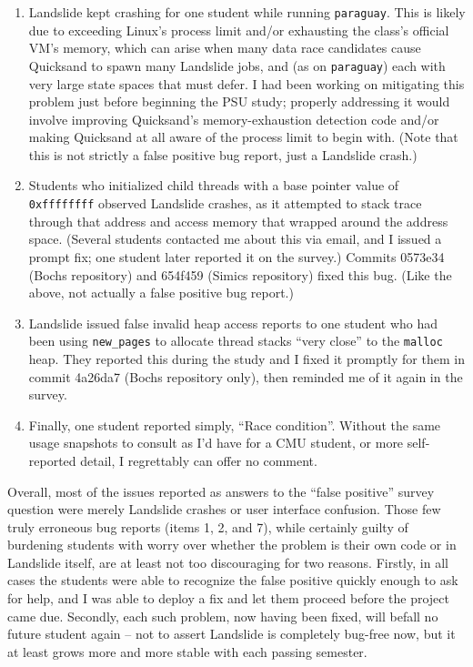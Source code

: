 \begin{enumerate}
	\item Landslide kept crashing for one student while running {\tt paraguay}.
		This is likely due to exceeding Linux's process limit and/or exhausting the class's official VM's memory,
		which can arise when many data race candidates cause Quicksand to spawn many Landslide jobs,
		and (as on {\tt paraguay}) each with very large state spaces that must defer.
		I had been working on mitigating this problem just before beginning the PSU study;
		properly addressing it would involve improving Quicksand's memory-exhaustion detection code
		and/or making Quicksand at all aware of the process limit to begin with.
		(Note that this is not strictly a false positive bug report, just a Landslide crash.)
	\item Students who initialized child threads with a base pointer value of {\tt 0xffffffff} observed Landslide crashes,
		as it attempted to stack trace through that address and access memory that wrapped around the address space.
		(Several students contacted me about this via email, and I issued a prompt fix;
		one student later reported it on the survey.)
		Commits 0573e34 (Bochs repository) and 654f459 (Simics repository) fixed this bug.
		(Like the above, not actually a false positive bug report.)
	\item Landslide issued false invalid heap access reports to one student
		who had been using {\tt new\_pages} to allocate thread stacks ``very close'' to the {\tt malloc} heap.
		They reported this during the study and I fixed it promptly for them in commit 4a26da7 (Bochs repository only),
		then reminded me of it again in the survey.
	\item Finally, one student reported simply, ``Race condition''.
		Without the same usage snapshots to consult as I'd have for a CMU student,
		or more self-reported detail, I regrettably can offer no comment.
\end{enumerate}

\noindent
Overall, most of the issues reported as answers to the ``false positive'' survey question
were merely Landslide crashes or user interface confusion.
Those few truly erroneous bug reports (items 1, 2, and 7),
while certainly guilty of burdening %
students with worry over whether the problem is their own code or in Landslide itself,
are at least not too discouraging for two reasons.
Firstly, in all cases the students were able to recognize the false positive quickly enough to ask for help,
and I was able to deploy a fix and let them proceed before the project came due.
Secondly, each such problem, now having been fixed, will befall no future student again --
not to assert Landslide is completely bug-free now,
but it at least grows more and more stable with each passing semester.

